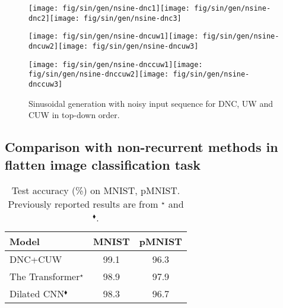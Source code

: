 \begin{figure}
\begin{centering}
\noindent\begin{minipage}[t]{1\columnwidth}\texttt{[image: fig/sin/gen/nsine-dnc1]}\texttt{[image: fig/sin/gen/nsine-dnc2]}\texttt{[image: fig/sin/gen/nsine-dnc3]}\end{minipage}
\par\end{centering}
\begin{centering}
\noindent\begin{minipage}[t]{1\columnwidth}\texttt{[image: fig/sin/gen/nsine-dncuw1]}\texttt{[image: fig/sin/gen/nsine-dncuw2]}\texttt{[image: fig/sin/gen/nsine-dncuw3]}\end{minipage}
\par\end{centering}
\begin{centering}
\noindent\begin{minipage}[t]{1\columnwidth}\texttt{[image: fig/sin/gen/nsine-dnccuw1]}\texttt{[image: fig/sin/gen/nsine-dnccuw2]}\texttt{[image: fig/sin/gen/nsine-dnccuw3]}\end{minipage}
\par\end{centering}
\caption{Sinusoidal generation with noisy input sequence for DNC, UW and CUW
in top-down order. \label{fig:Sinusoid-noisy}}
\end{figure}

\subsection{Comparison with non-recurrent methods in flatten image classification
task\label{subsec:Comparsion-with-non-recurrent}}

\begin{table}[H]
\begin{centering}
\begin{tabular}{|l|c|c|}
\hline 
Model & MNIST & pMNIST\tabularnewline
\hline 
\hline 
DNC+CUW & 99.1 & 96.3\tabularnewline
\hline 
The Transformer$^{\star}$ & 98.9 & 97.9\tabularnewline
\hline 
Dilated CNN$^{\blacklozenge}$ & 98.3 & 96.7\tabularnewline
\hline 
\end{tabular}
\par\end{centering}
\caption{Test accuracy (\%) on MNIST, pMNIST. Previously reported results are
from \cite{vaswani2017attention}$^{\star}$ and \cite{chang2017dilated}$^{\blacklozenge}$.
\label{tab:mnist-1}}
\end{table}


